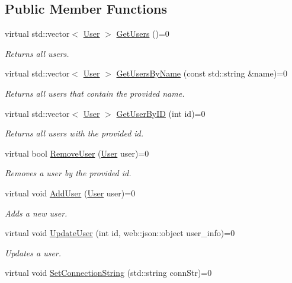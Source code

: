 \subsection*{Public Member Functions}
\begin{DoxyCompactItemize}
\item 
virtual std\+::vector$<$ \mbox{\hyperlink{structcadg__rest_1_1_user}{User}} $>$ \mbox{\hyperlink{classcadg__rest_1_1_data_access_interface_a657bd814589e6c5553a0303115350783}{Get\+Users}} ()=0
\begin{DoxyCompactList}\small\item\em Returns all users. \end{DoxyCompactList}\item 
virtual std\+::vector$<$ \mbox{\hyperlink{structcadg__rest_1_1_user}{User}} $>$ \mbox{\hyperlink{classcadg__rest_1_1_data_access_interface_ae6cf7e7fad98f27ffc797a9bf5a6b7df}{Get\+Users\+By\+Name}} (const std\+::string \&name)=0
\begin{DoxyCompactList}\small\item\em Returns all users that contain the provided name. \end{DoxyCompactList}\item 
virtual std\+::vector$<$ \mbox{\hyperlink{structcadg__rest_1_1_user}{User}} $>$ \mbox{\hyperlink{classcadg__rest_1_1_data_access_interface_a9df9cb8876073f42e7e54ada41eec3b3}{Get\+User\+By\+ID}} (int id)=0
\begin{DoxyCompactList}\small\item\em Returns all users with the provided id. \end{DoxyCompactList}\item 
virtual bool \mbox{\hyperlink{classcadg__rest_1_1_data_access_interface_a1f3c5c41611ae04a32935df01505c98d}{Remove\+User}} (\mbox{\hyperlink{structcadg__rest_1_1_user}{User}} user)=0
\begin{DoxyCompactList}\small\item\em Removes a user by the provided id. \end{DoxyCompactList}\item 
virtual void \mbox{\hyperlink{classcadg__rest_1_1_data_access_interface_a625cb7ba6f4637e3157acda84f81eae9}{Add\+User}} (\mbox{\hyperlink{structcadg__rest_1_1_user}{User}} user)=0
\begin{DoxyCompactList}\small\item\em Adds a new user. \end{DoxyCompactList}\item 
virtual void \mbox{\hyperlink{classcadg__rest_1_1_data_access_interface_ae44f7d277f8b8982869109e66333949a}{Update\+User}} (int id, web\+::json\+::object user\+\_\+info)=0
\begin{DoxyCompactList}\small\item\em Updates a user. \end{DoxyCompactList}\item 
virtual void \mbox{\hyperlink{classcadg__rest_1_1_data_access_interface_a919c1024501d1ba5eec4ff6dfce7c742}{Set\+Connection\+String}} (std\+::string conn\+Str)=0
\end{DoxyCompactItemize}


